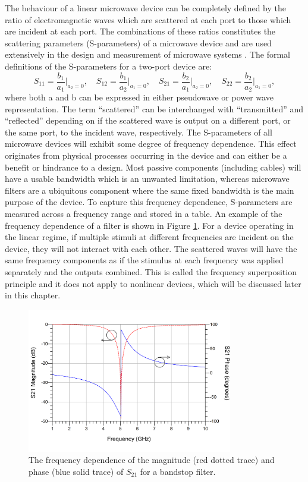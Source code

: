 \documentclass[../thesis/thesis.tex]{subfiles}
\begin{document}
The behaviour of a linear microwave device can be completely defined by the ratio of electromagnetic waves which are scattered at each port to those which are incident at each port. The combinations of these ratios constitutes the scattering parameters (S-parameters) of a microwave device and are used extensively in the design and measurement of microwave systems \cite{Pozar_2004}. The formal definitions of the S-parameters for a two-port device are:
\begin{equation}
S_{11}=\dfrac{b_1}{a_1}\bigg\rvert_{a_2=0},\quad
S_{12}=\dfrac{b_1}{a_2}\bigg\rvert_{a_1=0},\quad
S_{21}=\dfrac{b_2}{a_1}\bigg\rvert_{a_2=0},\quad
S_{22}=\dfrac{b_2}{a_2}\bigg\rvert_{a_1=0},
\label{ch2_eqn_sp}
\end{equation}
where both a and b can be expressed in either pseudowave or power wave representation. The term “scattered” can be interchanged with “transmitted” and “reflected” depending on if the scattered wave is output on a different port, or the same port, to the incident wave, respectively.
The S-parameters of all microwave devices will exhibit some degree of frequency dependence. This effect originates from physical processes occurring in the device and can either be a benefit or hindrance to a design. Most passive components (including cables) will have a usable bandwidth which is an unwanted limitation, whereas microwave filters are a ubiquitous component where the same fixed bandwidth is the main purpose of the device. To capture this frequency dependence, S-parameters are measured across a frequency range and stored in a table. An example of the frequency dependence of a filter is shown in Figure \ref{ch2_fig_filter}. For a device operating in the linear regime, if multiple stimuli at different frequencies are incident on the device, they will not interact with each other. The scattered waves will have the same frequency components as if the stimulus at each frequency was applied separately and the outputs combined. This is called the frequency superposition principle and it does not apply to nonlinear devices, which will be discussed later in this chapter.

\begin{figure}
	\centering
	\includegraphics[width=0.8\textwidth]{ch2_filter}
	\caption[The frequency dependence of a bandstop filter.]{The frequency dependence of the magnitude (red dotted trace) and phase (blue solid trace) of $S_{21}$ for a bandstop filter.}
	\label{ch2_fig_filter}
\end{figure}
\end{document}
